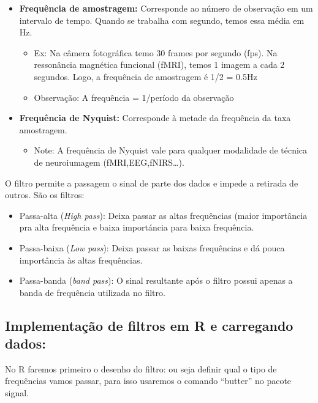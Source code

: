 \documentclass[]{article}
\providecommand{\tightlist}{%
  \setlength{\itemsep}{0pt}\setlength{\parskip}{0pt}}
\begin{document}
\begin{itemize}
\tightlist
\item
  \textbf{Frequência de amostragem:} Corresponde ao número de observação
  em um intervalo de tempo. Quando se trabalha com segundo, temos essa
  média em Hz.

  \begin{itemize}
  \tightlist
  \item
    Ex: Na câmera fotográfica temo 30 frames por segundo (fps). Na
    ressonância magnética funcional (fMRI), temos 1 imagem a cada 2
    segundos. Logo, a frequência de amostragem é 1/2 = 0.5Hz
  \item
    Observação: A frequência = 1/período da observação
  \end{itemize}
\item
  \textbf{Frequência de Nyquist:} Corresponde à metade da frequência da
  taxa amostragem.

  \begin{itemize}
  \tightlist
  \item
    Note: A frequência de Nyquist vale para qualquer modalidade de
    técnica de neuroiumagem (fMRI,EEG,fNIRS\ldots{}).
  \end{itemize}
\end{itemize}

O filtro permite a passagem o sinal de parte dos dados e impede a
retirada de outros. São os filtros:

\begin{itemize}
\item
  Passa-alta (\emph{High pass}): Deixa passar as altas frequências
  (maior importância pra alta frequência e baixa importáncia para baixa
  frequência.
\item
  Passa-baixa (\emph{Low pass}): Deixa passar as baixas frequências e dá
  pouca importância às altas frequências.
\item
  Passa-banda (\emph{band pass}): O sinal resultante após o filtro
  possui apenas a banda de frequência utilizada no filtro.
\end{itemize}

\subsection{Implementação de filtros em R e carregando
dados:}\label{implementacao-de-filtros-em-r-e-carregando-dados}

No R faremos primeiro o desenho do filtro: ou seja definir qual o tipo
de frequências vamos passar, para isso usaremos o comando ``butter'' no
pacote signal.
\end{document}
